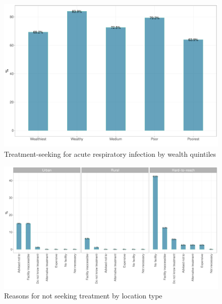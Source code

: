 \documentclass[12pt,a4paper]{article}
\begin{document}
\begin{figure}[H]

{\centering \includegraphics{kayahReport_files/figure-latex/ari2plot-1} 

}

\caption{Treatment-seeking for acute respiratory infection by wealth quintiles}\label{fig:ari2plot}
\end{figure}

\begin{figure}[H]

{\centering \includegraphics{kayahReport_files/figure-latex/ari3plot-1} 

}

\caption{Reasons for not seeking treatment by location type}\label{fig:ari3plot}
\end{figure}
\end{document}
